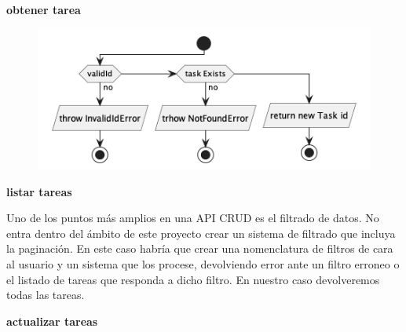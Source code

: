 \textbf{obtener tarea}

\begin{figure}[H]
    \centering
    \includegraphics[height=0.3\textheight]{./part/Proyecto_ejecutivo/memoria_descriptiva/descripcionDelProyecto/manager/uml/getTaskUseCase}
    \caption[Diagrama de objetos de dominio]{}\label{fig:getTaskUseCase}
\end{figure}

\textbf{listar tareas}

Uno de los puntos más amplios en una API CRUD es el filtrado de datos. No entra dentro del ámbito de este proyecto crear un sistema de filtrado que incluya la paginación. En este caso habría que crear una nomenclatura de filtros de cara al usuario y un sistema que los procese, devolviendo error ante un filtro erroneo o el listado de tareas que responda a dicho filtro. En nuestro caso devolveremos todas las tareas.

\textbf{actualizar tareas}

